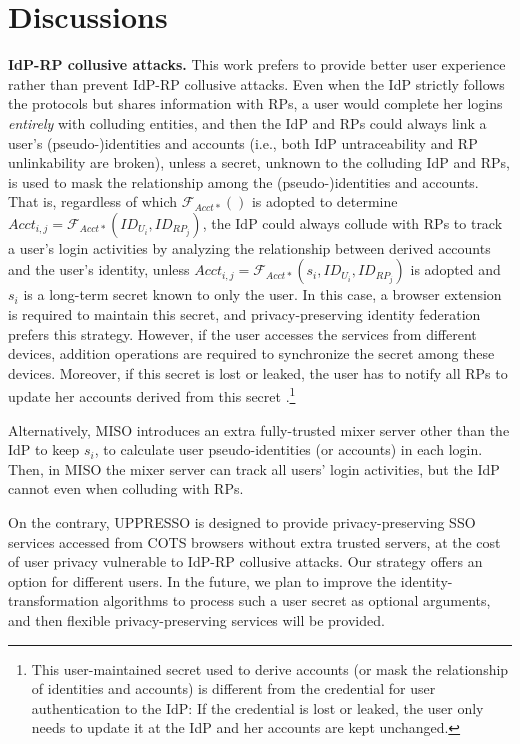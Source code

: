 \section{Discussions}
\label{sec:discussion}

\noindent \textbf{IdP-RP collusive attacks.} 
This work prefers to provide better user experience rather than prevent IdP-RP collusive attacks.
Even when the IdP strictly follows the protocols but shares information with RPs,
    a user would complete her logins \emph{entirely} with colluding entities,
    and then the IdP and RPs could always link a user's (pseudo-)identities and accounts (i.e., both IdP untraceability and RP unlinkability are broken),
    unless a secret, unknown to the colluding IdP and RPs,
                is used to mask the relationship among the (pseudo-)identities and accounts.
That is, regardless of which $\mathcal{F}_{Acct\ast}()$ is adopted to determine
$Acct_{i,j} = \mathcal{F}_{Acct\ast}(ID_{U_i}, ID_{RP_j})$,
the IdP could always collude with RPs to track a user's login activities by analyzing the relationship between derived accounts and the user's identity,
unless $Acct_{i,j} = \mathcal{F}_{Acct\ast}(s_i,ID_{U_i}, ID_{RP_j})$ is adopted and $s_i$ is a long-term secret known to only the user.
In this case,
    a browser extension is required
            to maintain this secret,
             and privacy-preserving identity federation \cite{ELPASSO, UnlimitID, idemix, PseudoID, uprov} prefers this strategy.
However, if the user accesses the services from different devices,
    addition operations are required to synchronize the secret among these devices.
Moreover, if this secret is lost or leaked, the user has to notify all RPs to update her accounts derived from this secret %
\cite{ELPASSO, UnlimitID}.\footnote{This user-maintained secret used to derive accounts (or mask the relationship of identities and accounts) is different from the credential for user
authentication to the IdP: If the credential is lost or leaked, the user only needs to update it at the IdP and her accounts are kept unchanged.}

Alternatively, MISO \cite{miso} introduces an extra fully-trusted mixer server other than the IdP to keep $s_i$,
            to calculate user pseudo-identities (or accounts) in each login.
Then, in MISO the mixer server can track all users' login activities,
    but the IdP cannot even when colluding with RPs.

On the contrary,
    UPPRESSO is designed to provide privacy-preserving SSO services accessed from COTS browsers without extra trusted servers,
        at the cost of user privacy vulnerable to IdP-RP collusive attacks.
Our strategy offers an option for different users.
In the future, we plan to improve the identity-transformation algorithms
    to process such a user secret as optional arguments,
    and then flexible privacy-preserving services will be provided.

